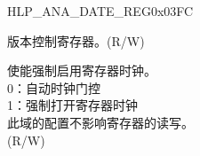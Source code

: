 \begin{register}{H}{LP\_ANA\_DATE\_REG}{0x03FC}\label{regdesc:LPANADATEREG}
%
%
\regnewline%
\begin{regdesc}\begin{reglist}
\label{fielddesc:LPANALPANADATE}\item [LP\_ANA\_LP\_ANA\_DATE] 版本控制寄存器。(R/W)
\label{fielddesc:LPANACLKEN}\item [LP\_ANA\_CLK\_EN] 使能强制启用寄存器时钟。\\
0：自动时钟门控\\
1：强制打开寄存器时钟\\
此域的配置不影响寄存器的读写。\\
(R/W)
\end{reglist}\end{regdesc}
\end{register}